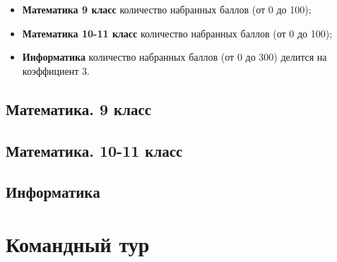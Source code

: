 \documentclass[a4paper,12pt,oneside]{book}
\begin{document}
\begin{itemize}
    \item {\bf Математика 9 класс} количество набранных баллов
    (от 0 до 100);
    \item {\bf Математика 10-11 класс} количество набранных баллов
    (от 0 до 100);
    \item {\bf Информатика} количество набранных баллов (от 0 до
    300) делится на коэффициент 3.
\end{itemize}


\section{Математика. 9 класс}


\section{Математика. 10-11 класс}


\section{Информатика}


\chapter{Командный тур}




\end{document}
